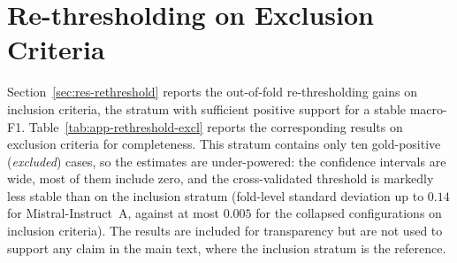 \section{Re-thresholding on Exclusion Criteria}
\label{sec:app-rethreshold-excl}

Section~\ref{sec:res-rethreshold} reports the out-of-fold re-thresholding 
gains on inclusion criteria, the stratum with sufficient positive support 
for a stable macro-F1. Table~\ref{tab:app-rethreshold-excl} reports the 
corresponding results on exclusion criteria for completeness. This stratum 
contains only ten gold-positive (\emph{excluded}) cases, so the estimates 
are under-powered: the confidence intervals are wide, most of them 
include zero, and the cross-validated threshold is markedly less stable 
than on the inclusion stratum (fold-level standard deviation up to 
$0.14$ for Mistral-Instruct~A, against at most $0.005$ for the collapsed 
configurations on inclusion criteria). The results are included for 
transparency but are not used to support any claim in the main text, 
where the inclusion stratum is the reference.

